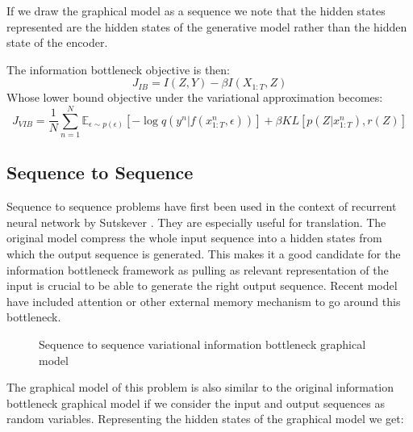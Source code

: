 \documentclass[10pt,oneside,openright]{report}
\begin{document}
If we draw the graphical model as a sequence we note that the hidden states represented are the hidden states of the generative model rather than the hidden state of the encoder. 

The information bottleneck objective is then:
$$ J_{IB} = I(Z, Y) - \beta I(X_{1:T}, Z)$$
Whose lower bound objective under the variational approximation becomes:
 $$ J_{VIB} = \frac{1}{N}  \sum_{n=1}^{N} \mathbb{E}_{\epsilon \sim p(\epsilon)}[- \log q(y^{n} |f(x_{1:T}^n, \epsilon))] + \beta KL[p(Z|x_{1:T}^n), r(Z)]$$

\subsection{Sequence to Sequence}
Sequence to sequence problems have first been used in the context of recurrent neural network by Sutskever \cite{s2s}. They are especially useful for translation. The original model compress the whole input sequence into a hidden states from which the output sequence is generated. This makes it a good candidate for the information bottleneck framework as pulling as relevant representation of the input is crucial to be able to generate the right output sequence. Recent model have included attention \cite{attention} or other external memory mechanism to go around this bottleneck.

\begin{figure}[H]
\centering
{}
\caption{Sequence to sequence variational information bottleneck graphical model}
\end{figure}

The graphical model of this problem is also similar to the original information bottleneck graphical model if we consider the input and output sequences as random variables. Representing the hidden states of the graphical model we get: 
\end{document}
